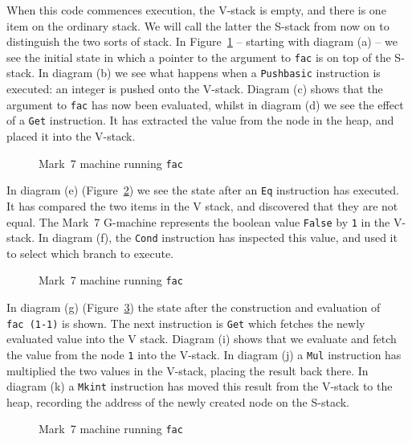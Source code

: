 When this code commences execution, the V-stack is empty, and there is
one item on the ordinary stack. We will call the latter the S-stack
from now on to distinguish the two sorts of stack. In
Figure~\ref{gm:fg:7fac1} -- starting with diagram (a) --
we see the initial state in which a pointer to the argument to \mbox{\tt fac}
is on top of the S-stack. In diagram (b) we see what happens when a
\mbox{\tt Pushbasic} instruction is executed: an integer is pushed onto the
V-stack. Diagram (c)
shows that the argument to \mbox{\tt fac} has now been evaluated, whilst in
diagram (d) we see the effect of a \mbox{\tt Get}
instruction. It has extracted the value from the node in the heap, and
placed it into the V-stack.
\begin{figure}

\caption{Mark~7 machine running \mbox{\tt fac}}\label{gm:fg:7fac1}
\end{figure}

In diagram (e) (Figure~\ref{gm:fg:7fac2}) we see the state
after an \mbox{\tt Eq} instruction has executed. It has compared the two items
in the V stack, and discovered that they are not equal. The Mark~7
G-machine represents the boolean value \mbox{\tt False} by \mbox{\tt 1} in the V-stack.
In diagram (f), the \mbox{\tt Cond} instruction has inspected this
value, and used it to select which branch to execute.
\begin{figure}

\caption{Mark~7 machine running \mbox{\tt fac}}\label{gm:fg:7fac2}
\end{figure}

In diagram (g) (Figure~\ref{gm:fg:7fac3}) the state after
the construction and evaluation of \mbox{\tt fac\ (1-1)} is shown. The next
instruction is \mbox{\tt Get} which fetches the newly evaluated value into the
V stack. Diagram (i) shows that we evaluate and fetch the value
from the node \mbox{\tt 1} into the V-stack. In diagram (j) a \mbox{\tt Mul}
instruction has multiplied the two values in the V-stack, placing the
result back there. In diagram (k) a \mbox{\tt Mkint} instruction has
moved this result from the V-stack to the heap, recording the address
of the newly created node on the S-stack.
\begin{figure}

\caption{Mark~7 machine running \mbox{\tt fac}}\label{gm:fg:7fac3}
\end{figure}

